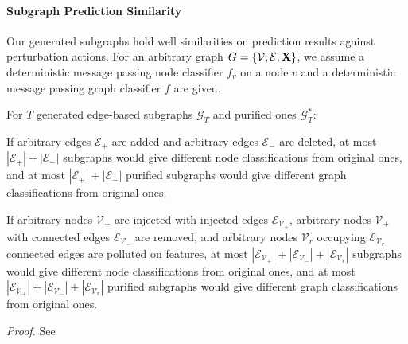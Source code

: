 \paragraph{Subgraph Prediction Similarity} Our generated subgraphs hold well similarities on prediction results against perturbation actions. For an arbitrary graph $G=\{\mathcal{V}, \mathcal{E}, {\bf X}\}$, we assume a deterministic message passing node classifier $f_{v}$ on a node $v$ and a deterministic message passing graph classifier $f$ are given.
\begin{theorem}%
\label{thm:edgediff}
 For $T$ generated edge-based subgraphs $\mathcal{G}_T$ and purified ones $\mathcal{G}_T^{*}$:
 \item If arbitrary edges $\mathcal{E}_+$ are added and arbitrary edges $\mathcal{E}_-$ are deleted, at most $|\mathcal{E}_+|+|\mathcal{E}_-|$ subgraphs would give different node classifications from original ones, and at most $|\mathcal{E}_+|+|\mathcal{E}_-|$ purified subgraphs would give different graph classifications from original ones; 
 \item If arbitrary nodes $\mathcal{V}_+$ are injected with injected edges $\mathcal{E}_{\mathcal{V}_+}$, arbitrary nodes $\mathcal{V}_+$ with connected edges $\mathcal{E}_{\mathcal{V}_-}$ are removed, and arbitrary nodes $\mathcal{V}_{r}$ occupying $\mathcal{E}_{\mathcal{V}_r}$ connected edges are polluted on features, at most $|\mathcal{E}_{\mathcal{V}_+}|+|\mathcal{E}_{\mathcal{V}_-}|+|\mathcal{E}_{\mathcal{V}_r}|$ subgraphs would give different node classifications from original ones, and at most $|\mathcal{E}_{\mathcal{V}_+}|+|\mathcal{E}_{\mathcal{V}_-}|+|\mathcal{E}_{\mathcal{V}_r}|$ purified subgraphs would give different graph classifications from original ones.
\end{theorem}
\emph{Proof.} See 
